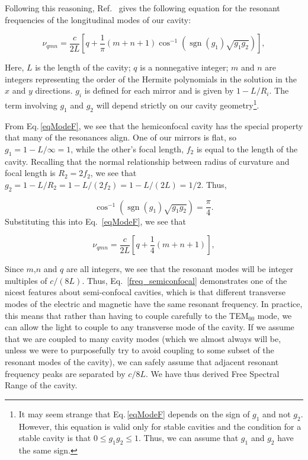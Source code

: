 Following this reasoning, Ref.\ \cite{lasersMilonniEberly} gives the following equation for the resonant frequencies of the longitudinal modes of our cavity:

\begin{equation} \label{eqModeF}
\nu_{qmn}=\frac{c}{2L}\left[q + \frac{1}{\pi}(m+n+1)\cos^{-1}(\operatorname{sgn}(g_1)\sqrt{g_1 g_2})\right], 
\end{equation}

Here, $L$ is the length of the cavity; $q$ is a nonnegative integer; $m$ and $n$ are integers representing the order of the Hermite polynomials in the solution in the $x$ and $y$ directions. $g_i$ is defined for each mirror and is given by $1-L/R_i$. The term involving $g_1$ and $g_2$ will depend strictly on our cavity geometry\footnote{It may seem strange that Eq.\,\ref{eqModeF} depends on the sign of $g_1$ and not $g_2$. However, this equation is valid only for stable cavities and the condition for a stable cavity is that $0\leq g_1 g_2 \leq 1$. Thus, we can assume that $g_1$ and $g_2$ have the same sign.}.

From Eq.\,\ref{eqModeF}, we see that the hemiconfocal cavity has the special property that many of the resonances align. One of our mirrors is flat, so $g_1=1-L/\infty=1$, while the other's focal length, $f_2$ is equal to the length of the cavity. Recalling that the normal relationship between radius of curvature and focal length is $R_2=2 f_2$, we see that $g_2=1-L/R_2=1-L/(2 f_2)=1-L/(2 L)=1/2$. Thus, 

\begin{equation}
\cos^{-1}(\operatorname{sgn}(g_1)\sqrt{g_1 g_2})=\frac{\pi}{4}.
\end{equation}
Substituting this into Eq.\ \ref{eqModeF}, we see that 

\begin{equation}\label{freq_semiconfocal}
\nu_{qmn}=\frac{c}{2L}\left[q + \frac{1}{4}(m+n+1)\right], 
\end{equation}

Since $m$,$n$ and $q$ are all integers, we see that the resonant modes will be integer multiples of $c/(8L)$. Thus, Eq.\ \ref{freq_semiconfocal} demonstrates one of the nicest features about semi-confocal cavities, which is that different transverse modes of the electric and magnetic have the same resonant frequency. In practice, this means that rather than having to couple carefully to the TEM$_{00}$ mode, we can allow the light to couple to any transverse mode of the cavity. If we assume that we are coupled to many cavity modes (which we almost always will be, unless we were to purposefully try to avoid coupling to some subset of the resonant modes of the cavity), we can safely assume that adjacent resonant frequency peaks are separated by $c/8L$. We have thus derived Free Spectral Range of the cavity. 

